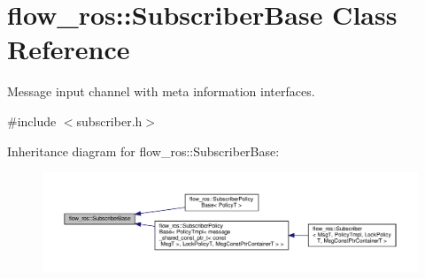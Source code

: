 \hypertarget{classflow__ros_1_1_subscriber_base}{}\section{flow\+\_\+ros\+:\+:Subscriber\+Base Class Reference}
\label{classflow__ros_1_1_subscriber_base}


Message input channel with meta information interfaces.  




{\ttfamily \#include $<$subscriber.\+h$>$}



Inheritance diagram for flow\+\_\+ros\+:\+:Subscriber\+Base\+:\nopagebreak
\begin{figure}[H]
\begin{center}
\leavevmode
\includegraphics[width=350pt]{classflow__ros_1_1_subscriber_base__inherit__graph}
\end{center}
\end{figure}
